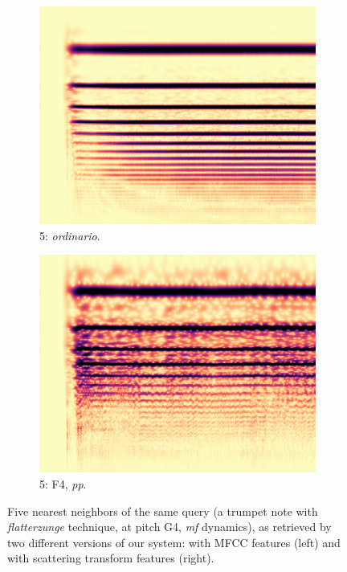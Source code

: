 \begin{figure}
        \begin{subfigure}{0.20\textwidth}
                \centering
                \includegraphics[width=\linewidth]{./figs/demo/TpC-ord-G4-mf.png}
                \caption*{5: \emph{ordinario}.}
                \label{fig:TpC-ord-G4-mf}
        \end{subfigure}%
        \begin{subfigure}{0.20\textwidth}
                \centering
                \includegraphics[width=\linewidth]{./figs/demo/TpC-flatt-F4-pp.png}
                \caption*{5: F4, \emph{pp}.}
                \label{fig:TpC-flatt-F4-pp}
        \end{subfigure}%

        \caption{Five nearest neighbors of the same query (a trumpet note with \emph{flatterzunge} technique, at pitch G4, \emph{mf} dynamics), as retrieved by two different versions of our system: with MFCC features (left) and with scattering transform features (right).%
}\label{fig:demo-extended}
\end{figure}


